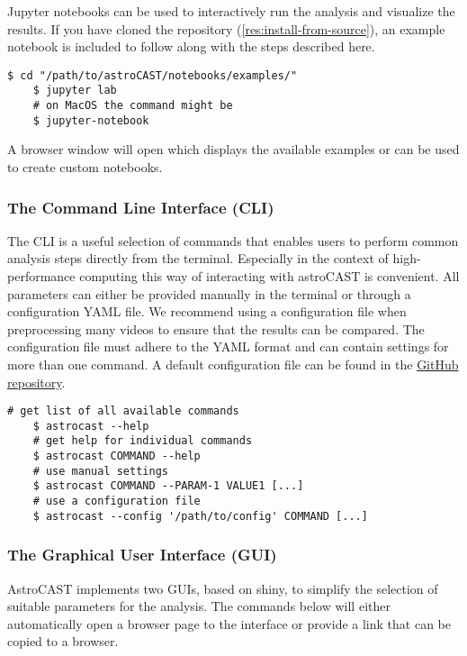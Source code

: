 Jupyter notebooks can be used to interactively run the analysis and visualize the results.
If you have cloned the repository (\ref{res:install-from-source}), an example notebook is included to follow along with the steps described here.

\begin{lstlisting}[style=bashStyle]
    $ cd "/path/to/astroCAST/notebooks/examples/"
    $ jupyter lab
    # on MacOS the command might be
    $ jupyter-notebook
\end{lstlisting}

A browser window will open which displays the available examples or can be used to create custom notebooks.

\subsubsection{The Command Line Interface (CLI)}

The \ac{CLI} is a useful selection of commands that enables users to perform common analysis steps directly from the terminal. Especially in the context of high-performance computing this way of interacting with astroCAST is convenient. All parameters can either be provided manually in the terminal or through a configuration YAML file. We recommend using a configuration file when preprocessing many videos to ensure that the results can be compared. The configuration file must adhere to the YAML format and can contain settings for more than one command. A default configuration file can be found in the \href{https://github.com/janreising/astroCAST/blob/3ad41d03068732419df7fdde9b2a0f449898d4e2/config.yaml}{GitHub repository}.

\begin{lstlisting}[style=bashStyle]
    # get list of all available commands
    $ astrocast --help
    # get help for individual commands
    $ astrocast COMMAND --help
    # use manual settings
    $ astrocast COMMAND --PARAM-1 VALUE1 [...]
    # use a configuration file
    $ astrocast --config '/path/to/config' COMMAND [...]
\end{lstlisting}

\subsubsection{The Graphical User Interface (GUI)}

AstroCAST implements two \ac{GUI}s, based on shiny\citep{chang_shiny_2024}, to simplify the selection of suitable parameters for the analysis. The commands below will either automatically open a browser page to the interface or provide a link that can be copied to a browser.

